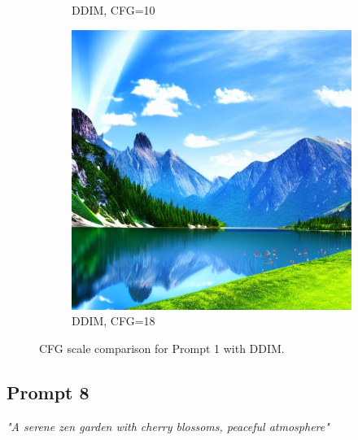 \documentclass[10pt,twocolumn]{article}
\begin{document}
\begin{figure}[H]
\begin{subfigure}{0.32\textwidth}
        \caption{DDIM, CFG=10}
    \end{subfigure}
    \begin{subfigure}{0.32\textwidth}
        \includegraphics[width=\linewidth]{figures/baseline_ddim_cfg18.0_512_prompt1_20250712_093404.png}
        \caption{DDIM, CFG=18}
    \end{subfigure}
    \caption{CFG scale comparison for Prompt 1 with DDIM.}
\end{figure}

\subsection*{Prompt 8}
\noindent\textit{"A serene zen garden with cherry blossoms, peaceful atmosphere"}
\end{document}
